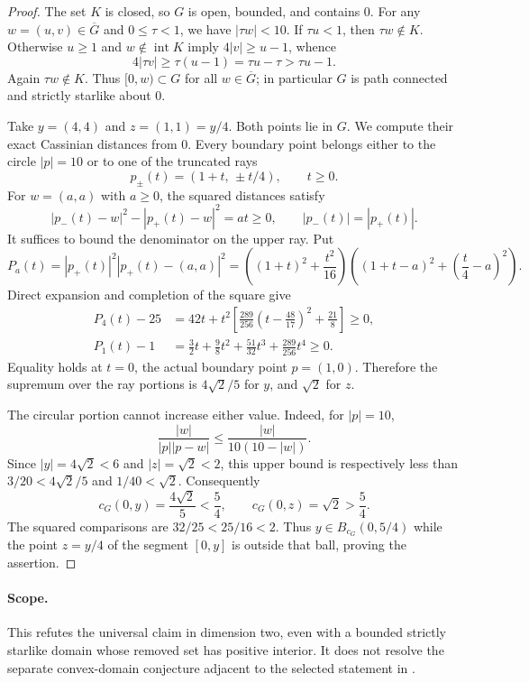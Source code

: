 \documentclass[11pt]{article}
\begin{document}
\begin{proof}
The set $K$ is closed, so $G$ is open, bounded, and contains $0$.
For any $w=(u,v)\in\overline G$ and $0\le\tau<1$, we have
$|\tau w|<10$. If $\tau u<1$, then $\tau w\notin K$.
Otherwise $u\ge1$ and $w\notin\operatorname{int}K$ imply
$4|v|\ge u-1$, whence
\[
 4|\tau v|\ge\tau(u-1)=\tau u-\tau>\tau u-1.
\]
Again $\tau w\notin K$. Thus $[0,w)\subset G$ for all $w\in\overline G$;
in particular $G$ is path connected and strictly starlike about $0$.

Take $y=(4,4)$ and $z=(1,1)=y/4$. Both points lie in $G$.
We compute their exact Cassinian distances from $0$.
Every boundary point belongs either to the circle $|p|=10$ or to one of
the truncated rays
\[
 p_\pm(t)=(1+t,\,\pm t/4),\qquad t\ge0.
\]
For $w=(a,a)$ with $a\ge0$, the squared distances satisfy
\[
 |p_-(t)-w|^2-|p_+(t)-w|^2=at\ge0,
 \qquad |p_-(t)|=|p_+(t)|.
\]
It suffices to bound the denominator on the upper ray. Put
\[
 P_a(t)=|p_+(t)|^2|p_+(t)-(a,a)|^2
 =\left((1+t)^2+\frac{t^2}{16}\right)
  \left((1+t-a)^2+\left(\frac t4-a\right)^2\right).
\]
Direct expansion and completion of the square give
\begin{align*}
 P_4(t)-25&=42t+t^2\left[
    \frac{289}{256}\left(t-\frac{48}{17}\right)^2+\frac{21}{8}\right]\ge0,\\
 P_1(t)-1&=\frac32t+\frac98t^2+\frac{51}{32}t^3+
                \frac{289}{256}t^4\ge0.
\end{align*}
Equality holds at $t=0$, the actual boundary point $p=(1,0)$.
Therefore the supremum over the ray portions is $4\sqrt2/5$ for $y$,
and $\sqrt2$ for $z$.

The circular portion cannot increase either value. Indeed, for $|p|=10$,
\[
 \frac{|w|}{|p||p-w|}\le\frac{|w|}{10(10-|w|)}.
\]
Since $|y|=4\sqrt2<6$ and $|z|=\sqrt2<2$, this upper bound is respectively
less than $3/20<4\sqrt2/5$ and $1/40<\sqrt2$. Consequently
\[
 c_G(0,y)=\frac{4\sqrt2}{5}<\frac54,
 \qquad c_G(0,z)=\sqrt2>\frac54.
\]
The squared comparisons are $32/25<25/16<2$.
Thus $y\in B_{c_G}(0,5/4)$ while the point $z=y/4$ of the segment
$[0,y]$ is outside that ball, proving the assertion.
\end{proof}

\paragraph{Scope.}
This refutes the universal claim in dimension two, even with a bounded
strictly starlike domain whose removed set has positive interior. It does
not resolve the separate convex-domain conjecture adjacent to the selected
statement in \cite{KMS}.
\end{document}
